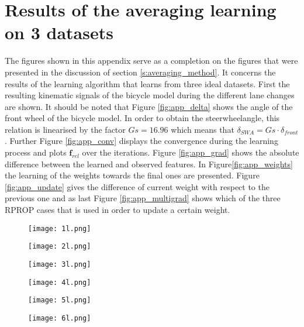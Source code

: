 \chapter{Results of the averaging learning on 3 datasets}
\label{app:C}
The figures shown in this appendix serve as a completion on the figures that were presented in the discussion of section \ref{s:averaging_method}. It concerns the results of the learning algorithm that learns from three ideal datasets. First the resulting kinematic signals of the bicycle model during the different lane changes are shown. It should be noted that Figure \ref{fig:app_delta} shows the angle of the front wheel of the bicycle model. In order to obtain the steerwheelangle, this relation is linearised by the factor $Gs = 16.96$ which means that $\delta_{SWA} = Gs\cdot\delta_{front}$. Further Figure \ref{fig:app_conv} displays the convergence during the learning process and plots $\bm{f}_{rel}$ over the iterations. Figure \ref{fig:app_grad} shows the absolute difference between the learned and observed features. In Figure\ref{fig:app_weights} the learning of the weights towards the final ones are presented. Figure \ref{fig:app_update} gives the difference of current weight with respect to the previous one and as last Figure \ref{fig:app_multigrad} shows which of the three RPROP cases that is used in order to update a certain weight. 

 
\begin{figure}[h!]
	\texttt{[image: 1l.png]}
\end{figure}

\begin{figure}[h!]
	\centering
	\texttt{[image: 2l.png]}
	\label{fig:lat_acc_val}
\end{figure}

\begin{figure}[h!]
	\centering
	\texttt{[image: 3l.png]}
	\label{fig:lat_acc_val}
\end{figure}


\begin{figure}[h!]
	\centering
	\texttt{[image: 4l.png]}
	\label{fig:lat_acc_val}
\end{figure}


\begin{figure}[h!]
	\centering
	\texttt{[image: 5l.png]}
	\label{fig:lat_acc_val}
\end{figure}


\begin{figure}[h!]
	\centering
	\texttt{[image: 6l.png]}
	\label{fig:lat_acc_val}
\end{figure}


